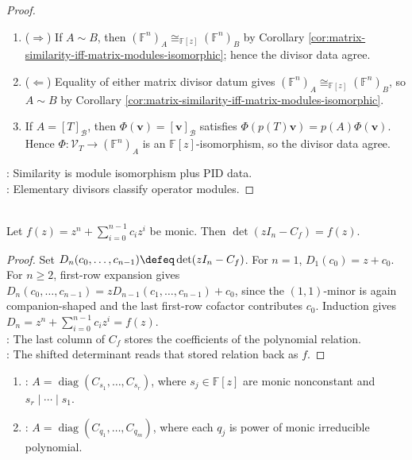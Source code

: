 \begin{theorem}
\begin{proof}
\begin{enumerate}[label=(\roman*).]
Thus $T\sim S$ by Theorem \ref{thm:operator-similarity-iff-module-isomorphism}.
\item[$(ii)$]($\Rightarrow$) If $A\sim B$, then $(\mathbb{F}^n)_A\cong_{\mathbb{F}[z]}(\mathbb{F}^n)_B$ by Corollary \ref{cor:matrix-similarity-iff-matrix-modules-isomorphic}; hence the divisor data agree.
\item[$(ii)$]($\Leftarrow$) Equality of either matrix divisor datum gives $(\mathbb{F}^n)_A\cong_{\mathbb{F}[z]}(\mathbb{F}^n)_B$, so $A\sim B$ by Corollary \ref{cor:matrix-similarity-iff-matrix-modules-isomorphic}.
\item[$(iii)$] If $A=[T]_{\mathcal{B}}$, then $\Phi(\mathbf{v})=[\mathbf{v}]_{\mathcal{B}}$ satisfies $\Phi(p(T)\mathbf{v})=p(A)\Phi(\mathbf{v})$.\\
Hence $\Phi:\mathcal{V}_T\to(\mathbb{F}^n)_A$ is an $\mathbb{F}[z]$-isomorphism, so the divisor data agree.
\end{enumerate}
: Similarity is module isomorphism plus PID data.\\
: Elementary divisors classify operator modules.
\end{proof}
\end{theorem}

\begin{lemma} \label{lem:determinant-of-companion-matrix} \\
Let $f(z)=z^n+\sum_{i=0}^{n-1}c_iz^i$ be monic. Then $\det(zI_n-C_f)=f(z)$.
\begin{proof} Set $D_n(c_0,\ldots,c_{n-1})\defeq\det(zI_n-C_f)$. For $n=1$, $D_1(c_0)=z+c_0$.\\
For $n\geq2$, first-row expansion gives $D_n(c_0,\ldots,c_{n-1})=zD_{n-1}(c_1,\ldots,c_{n-1})+c_0$, since the $(1,1)$-minor is again companion-shaped and the last first-row cofactor contributes $c_0$. Induction gives $D_n=z^n+\sum_{i=0}^{n-1}c_iz^i=f(z)$.\\
: The last column of $C_f$ stores the coefficients of the polynomial relation.\\
: The shifted determinant reads that stored relation back as $f$.
\end{proof}
\end{lemma}

\begin{definition} \label{def:rational-canonical-block-forms} 
\begin{enumerate}[label=(\roman*)]
\setlength{\itemsep}{0pt}
\item {}: $A=\operatorname{diag}(C_{s_1},\ldots,C_{s_r})$, where $s_j\in\mathbb{F}[z]$ are monic nonconstant and $s_r\mid\cdots\mid s_1$.
\item {}: $A=\operatorname{diag}(C_{q_1},\ldots,C_{q_m})$, where each $q_j$ is power of monic irreducible polynomial.
\end{enumerate}
\end{definition}

